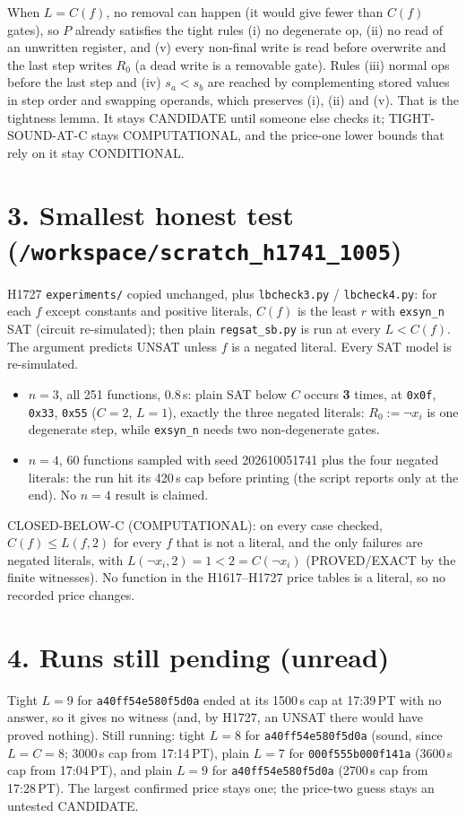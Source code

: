 \documentclass[11pt]{article}
\begin{document}
When $L=C(f)$, no removal can happen (it would give fewer than $C(f)$ gates), so $P$ already satisfies the tight rules (i) no degenerate op, (ii) no read of an unwritten register, and (v) every non-final write is read before overwrite and the last step writes $R_0$ (a dead write is a removable gate). Rules (iii) normal ops before the last step and (iv) $s_a<s_b$ are reached by complementing stored values in step order and swapping operands, which preserves (i), (ii) and (v). That is the tightness lemma. It stays CANDIDATE until someone else checks it; TIGHT-SOUND-AT-C stays COMPUTATIONAL, and the price-one lower bounds that rely on it stay CONDITIONAL.

\section*{3. Smallest honest test (\texttt{/workspace/scratch\_h1741\_1005})}
H1727 \texttt{experiments/} copied unchanged, plus \texttt{lbcheck3.py} / \texttt{lbcheck4.py}: for each $f$ except constants and positive literals, $C(f)$ is the least $r$ with \texttt{exsyn\_n} SAT (circuit re-simulated); then plain \texttt{regsat\_sb.py} is run at every $L<C(f)$. The argument predicts UNSAT unless $f$ is a negated literal. Every SAT model is re-simulated.
\begin{itemize}
\item $n=3$, all 251 functions, 0.8\,s: plain SAT below $C$ occurs \textbf{3} times, at \texttt{0x0f}, \texttt{0x33}, \texttt{0x55} ($C=2$, $L=1$), exactly the three negated literals: $R_0:=\lnot x_i$ is one degenerate step, while \texttt{exsyn\_n} needs two non-degenerate gates.
\item $n=4$, 60 functions sampled with seed 202610051741 plus the four negated literals: the run hit its 420\,s cap before printing (the script reports only at the end). No $n=4$ result is claimed.
\end{itemize}
CLOSED-BELOW-C (COMPUTATIONAL): on every case checked, $C(f)\le L(f,2)$ for every $f$ that is not a literal, and the only failures are negated literals, with $L(\lnot x_i,2)=1<2=C(\lnot x_i)$ (PROVED/EXACT by the finite witnesses). No function in the H1617--H1727 price tables is a literal, so no recorded price changes.

\section*{4. Runs still pending (unread)}
Tight $L=9$ for \texttt{a40ff54e580f5d0a} ended at its 1500\,s cap at 17:39\,PT with no answer, so it gives no witness (and, by H1727, an UNSAT there would have proved nothing). Still running: tight $L=8$ for \texttt{a40ff54e580f5d0a} (sound, since $L=C=8$; 3000\,s cap from 17:14\,PT), plain $L=7$ for \texttt{000f555b000f141a} (3600\,s cap from 17:04\,PT), and plain $L=9$ for \texttt{a40ff54e580f5d0a} (2700\,s cap from 17:28\,PT). The largest confirmed price stays one; the price-two guess stays an untested CANDIDATE.
\end{document}
